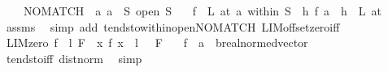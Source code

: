 \begin{isabellebody}
\ \ \ {\isachardoublequoteopen}\ NO{\isacharunderscore}{\kern0pt}MATCH\ {}\ a{\isachardoublequoteclose}\ {\isachardoublequoteopen}a\ {\isasymin}\ S{\isachardoublequoteclose}\ {\isachardoublequoteopen}open\ S{\isachardoublequoteclose}\isanewline
\ \ \ {\isachardoublequoteopen}{\isacharparenleft}{\kern0pt}f\ {\isasymlonglongrightarrow}\ L{\isacharparenright}{\kern0pt}\ {\isacharparenleft}{\kern0pt}at\ a\ within\ S{\isacharparenright}{\kern0pt}\ {\isasymlongleftrightarrow}\ {\isacharparenleft}{\kern0pt}{\isacharparenleft}{\kern0pt}{\isasymlambda}h{\isachardot}{\kern0pt}\ f\ {\isacharparenleft}{\kern0pt}a\ {\isacharplus}{\kern0pt}\ h{\isacharparenright}{\kern0pt}{\isacharparenright}{\kern0pt}\ {\isasymlonglongrightarrow}\ L{\isacharparenright}{\kern0pt}\ {\isacharparenleft}{\kern0pt}at\ {}{\isacharparenright}{\kern0pt}{\isachardoublequoteclose}\isanewline
%
\isadelimproof
\ \ %
\endisadelimproof
%
\isatagproof
{}\isamarkupfalse%
\ assms\ \isamarkupfalse%
\ {\isacharparenleft}{\kern0pt}simp\ add{\isacharcolon}{\kern0pt}\ tendsto{\isacharunderscore}{\kern0pt}within{\isacharunderscore}{\kern0pt}open{\isacharunderscore}{\kern0pt}NO{\isacharunderscore}{\kern0pt}MATCH\ LIM{\isacharunderscore}{\kern0pt}offset{\isacharunderscore}{\kern0pt}zero{\isacharunderscore}{\kern0pt}iff{\isacharparenright}{\kern0pt}%
\endisatagproof
{\isafoldproof}%
%
\isadelimproof
\isanewline
%
\endisadelimproof
\isanewline
{}\isamarkupfalse%
\ LIM{\isacharunderscore}{\kern0pt}zero{\isacharcolon}{\kern0pt}\ {\isachardoublequoteopen}{\isacharparenleft}{\kern0pt}f\ {\isasymlonglongrightarrow}\ l{\isacharparenright}{\kern0pt}\ F\ {\isasymLongrightarrow}\ {\isacharparenleft}{\kern0pt}{\isacharparenleft}{\kern0pt}{\isasymlambda}x{\isachardot}{\kern0pt}\ f\ x\ {\isacharminus}{\kern0pt}\ l{\isacharparenright}{\kern0pt}\ {\isasymlonglongrightarrow}\ {}{\isacharparenright}{\kern0pt}\ F{\isachardoublequoteclose}\isanewline
\ \ \ f\ {\isacharcolon}{\kern0pt}{\isacharcolon}{\kern0pt}\ {\isachardoublequoteopen}{\isacharprime}{\kern0pt}a\ {\isasymRightarrow}\ {\isacharprime}{\kern0pt}b{\isacharcolon}{\kern0pt}{\isacharcolon}{\kern0pt}real{\isacharunderscore}{\kern0pt}normed{\isacharunderscore}{\kern0pt}vector{\isachardoublequoteclose}\isanewline
%
\isadelimproof
\ \ %
\endisadelimproof
%
\isatagproof
{}\isamarkupfalse%
\ tendsto{\isacharunderscore}{\kern0pt}iff\ dist{\isacharunderscore}{\kern0pt}norm\ \isamarkupfalse%
\ simp%
\endisatagproof

\end{isabellebody}
